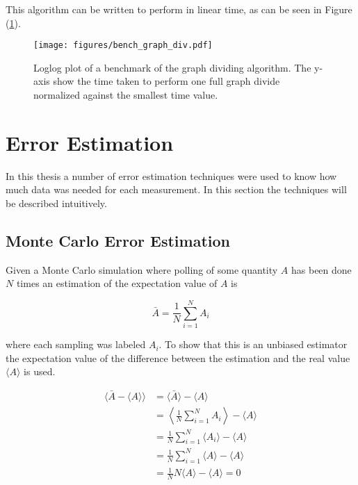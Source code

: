 This algorithm can be written to perform in linear time, as can be seen in Figure (\ref{fig:bench_graphdiv}). 

\begin{figure}[h!]
    \centering
        \texttt{[image: figures/bench\_graph\_div.pdf]}
    \caption{Loglog plot of a benchmark of the graph dividing algorithm. The y-axis show the time taken to perform one full graph divide normalized against the smallest time value.}
    \label{fig:bench_graphdiv}
\end{figure}

\section{Error Estimation}
\label{sec:ErrorEst}

In this thesis a number of error estimation techniques were used to know how much data was needed for each measurement. In this section the techniques will be described intuitively.

\subsection{Monte Carlo Error Estimation}
\label{subsec:MonteCarloErrorEst}

Given a Monte Carlo simulation where polling of some quantity $A$ has been done $N$ times an estimation of the expectation value of $A$ is

\begin{equation}
    \bar A = \frac{1}{N} \sum_{i = 1}^{N} A_i
\end{equation}

where each sampling was labeled $A_i$. To show that this is an unbiased estimator the expectation value of the difference between the estimation and the real value $\langle A \rangle$ is used.

\begin{align}
    \langle \bar A - \langle A \rangle \rangle &= \langle \bar A \rangle - \langle A \rangle \\
%
    &= \left \langle \frac{1}{N} \sum_{i = 1}^{N} A_i \right \rangle - \langle A \rangle \\
%
    &= \frac{1}{N} \sum_{i = 1}^{N} \langle A_i \rangle - \langle A \rangle \\
\label{eq:unbiasedEst}
%
    &= \frac{1}{N} \sum_{i = 1}^{N} \langle A \rangle - \langle A \rangle \\
%
    &= \frac{1}{N} N \langle A \rangle - \langle A \rangle = 0
\end{align}

